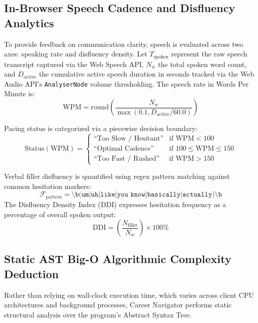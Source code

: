 \documentclass[conference]{IEEEtran}
\begin{document}
\subsection{In-Browser Speech Cadence and Disfluency Analytics}
To provide feedback on communication clarity, speech is evaluated across two axes: speaking rate and disfluency density. Let $T_{\mathrm{spoken}}$ represent the raw speech transcript captured via the Web Speech API, $N_w$ the total spoken word count, and $D_{\mathrm{active}}$ the cumulative active speech duration in seconds tracked via the Web Audio API's \texttt{AnalyserNode} volume thresholding. The speech rate in Words Per Minute is:
\begin{equation}
    \mathrm{WPM} = \mathrm{round}\left( \frac{N_w}{\max(0.1, D_{\mathrm{active}} / 60.0)} \right)
\end{equation}

Pacing status is categorized via a piecewise decision boundary:
\begin{equation}
    \mathrm{Status}(\mathrm{WPM}) = 
    \begin{cases}
        \text{``Too Slow / Hesitant''} & \text{if } \mathrm{WPM} < 100 \\
        \text{``Optimal Cadence''} & \text{if } 100 \le \mathrm{WPM} \le 150 \\
        \text{``Too Fast / Rushed''} & \text{if } \mathrm{WPM} > 150
    \end{cases}
\end{equation}

Verbal filler disfluency is quantified using regex pattern matching against common hesitation markers:
\begin{equation}
    \mathcal{F}_{\mathrm{pattern}} = \texttt{\textbackslash b(um|uh|like|you know|basically|actually)\textbackslash b}
\end{equation}
The Disfluency Density Index ($\mathrm{DDI}$) expresses hesitation frequency as a percentage of overall spoken output:
\begin{equation}
    \mathrm{DDI} = \left( \frac{N_{\mathrm{filler}}}{N_w} \right) \times 100\%
\end{equation}

\subsection{Static AST Big-O Algorithmic Complexity Deduction}
Rather than relying on wall-clock execution time, which varies across client CPU architectures and background processes, Career Navigator performs static structural analysis over the program's Abstract Syntax Tree. 
\end{document}
